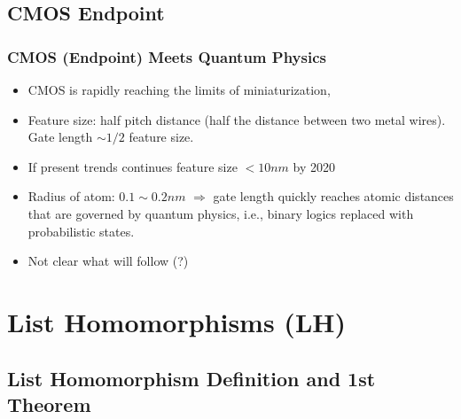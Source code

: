 \documentclass{beamer}
\begin{document}
\subsection{CMOS Endpoint}
\begin{frame}[fragile,t]
\frametitle{CMOS (Endpoint) Meets Quantum Physics}

\begin{itemize}
    \item CMOS is rapidly reaching the limits of miniaturization,\medskip

    \item Feature size: half pitch distance (half the distance between
            two metal wires). Gate length $\sim 1/2$ feature size.\medskip

    \item If present trends continues feature size $< 10 nm$ by 2020\medskip

    \item Radius of atom: $0.1 \sim 0.2 nm$ $\Rightarrow$ gate length quickly
            reaches atomic distances that are governed by quantum physics,
            i.e., binary logics replaced with probabilistic states.\medskip

    \item Not clear what will follow (?)
\end  {itemize}
\end{frame}


\section{List Homomorphisms (LH)}

\subsection{List Homomorphism Definition and 1st Theorem}

\begin{frame}[fragile]
	\tableofcontents[currentsection]
\end{frame}
\end{document}
